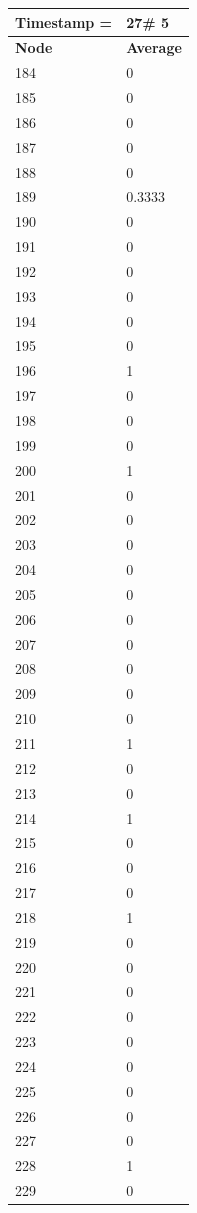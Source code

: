 \begin{tabular}{|l||l|}
\hline
\textbf{Timestamp =} & \textbf{27}\# 5\\\hline
	\textbf{Node} & \textbf{Average} \\ \hline
\hline
	184 & 0 \\ \hline
	185 & 0 \\ \hline
	186 & 0 \\ \hline
	187 & 0 \\ \hline
	188 & 0 \\ \hline
	189 & 0.3333 \\ \hline
	190 & 0 \\ \hline
	191 & 0 \\ \hline
	192 & 0 \\ \hline
	193 & 0 \\ \hline
	194 & 0 \\ \hline
	195 & 0 \\ \hline
	196 & 1 \\ \hline
	197 & 0 \\ \hline
	198 & 0 \\ \hline
	199 & 0 \\ \hline
	200 & 1 \\ \hline
	201 & 0 \\ \hline
	202 & 0 \\ \hline
	203 & 0 \\ \hline
	204 & 0 \\ \hline
	205 & 0 \\ \hline
	206 & 0 \\ \hline
	207 & 0 \\ \hline
	208 & 0 \\ \hline
	209 & 0 \\ \hline
	210 & 0 \\ \hline
	211 & 1 \\ \hline
	212 & 0 \\ \hline
	213 & 0 \\ \hline
	214 & 1 \\ \hline
	215 & 0 \\ \hline
	216 & 0 \\ \hline
	217 & 0 \\ \hline
	218 & 1 \\ \hline
	219 & 0 \\ \hline
	220 & 0 \\ \hline
	221 & 0 \\ \hline
	222 & 0 \\ \hline
	223 & 0 \\ \hline
	224 & 0 \\ \hline
	225 & 0 \\ \hline
	226 & 0 \\ \hline
	227 & 0 \\ \hline
	228 & 1 \\ \hline
	229 & 0 \\ \hline
\end{tabular}
